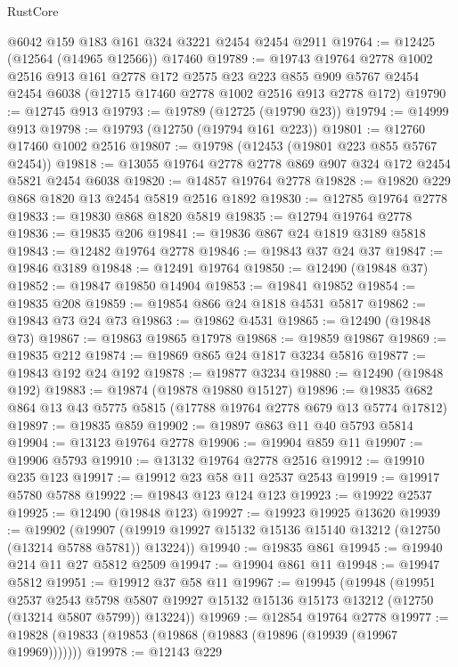\begin{lexlean}{RustCore}
\begin{coremodule}
    @6042
    @159
    @183
    @161
    @324
    @3221
    @2454
    @2454
    @2911
@19764 := @12425 (@12564 (@14965 @12566)) @17460
@19789 := @19743
    @19764
    @2778
    @1002
    @2516
    @913
    @161
    @2778
    @172
    @2575
    @23
    @223
    @855
    @909
    @5767
    @2454
    @2454
    @6038
    (@12715 @17460 @2778 @1002 @2516 @913 @2778 @172)
@19790 := @12745 @913
@19793 := @19789 (@12725 (@19790 @23))
@19794 := @14999 @913
@19798 := @19793 (@12750 (@19794 @161 @223))
@19801 := @12760 @17460 @1002 @2516
@19807 := @19798 (@12453 (@19801 @223 @855 @5767 @2454))
@19818 := @13055 @19764 @2778 @2778 @869 @907 @324 @172 @2454 @5821 @2454 @6038
@19820 := @14857 @19764 @2778
@19828 := @19820 @229 @868 @1820 @13 @2454 @5819 @2516 @1892
@19830 := @12785 @19764 @2778
@19833 := @19830 @868 @1820 @5819
@19835 := @12794 @19764 @2778
@19836 := @19835 @206
@19841 := @19836 @867 @24 @1819 @3189 @5818
@19843 := @12482 @19764 @2778
@19846 := @19843 @37 @24 @37
@19847 := @19846 @3189
@19848 := @12491 @19764
@19850 := @12490 (@19848 @37)
@19852 := @19847 @19850 @14904
@19853 := @19841 @19852
@19854 := @19835 @208
@19859 := @19854 @866 @24 @1818 @4531 @5817
@19862 := @19843 @73 @24 @73
@19863 := @19862 @4531
@19865 := @12490 (@19848 @73)
@19867 := @19863 @19865 @17978
@19868 := @19859 @19867
@19869 := @19835 @212
@19874 := @19869 @865 @24 @1817 @3234 @5816
@19877 := @19843 @192 @24 @192
@19878 := @19877 @3234
@19880 := @12490 (@19848 @192)
@19883 := @19874 (@19878 @19880 @15127)
@19896 := @19835 @682 @864 @13 @43 @5775 @5815 (@17788 @19764 @2778 @679 @13 @5774 @17812)
@19897 := @19835 @859
@19902 := @19897 @863 @11 @40 @5793 @5814
@19904 := @13123 @19764 @2778
@19906 := @19904 @859 @11
@19907 := @19906 @5793
@19910 := @13132 @19764 @2778 @2516
@19912 := @19910 @235 @123
@19917 := @19912 @23 @58 @11 @2537 @2543
@19919 := @19917 @5780 @5788
@19922 := @19843 @123 @124 @123
@19923 := @19922 @2537
@19925 := @12490 (@19848 @123)
@19927 := @19923 @19925 @13620
@19939 := @19902
    (@19907 (@19919 @19927 @15132 @15136 @15140 @13212 (@12750 (@13214 @5788 @5781)) @13224))
@19940 := @19835 @861
@19945 := @19940 @214 @11 @27 @5812 @2509
@19947 := @19904 @861 @11
@19948 := @19947 @5812
@19951 := @19912 @37 @58 @11
@19967 := @19945
    (@19948
      (@19951
        @2537
        @2543
        @5798
        @5807
        @19927
        @15132
        @15136
        @15173
        @13212
        (@12750 (@13214 @5807 @5799))
        @13224))
@19969 := @12854 @19764 @2778
@19977 := @19828 (@19833 (@19853 (@19868 (@19883 (@19896 (@19939 (@19967 @19969)))))))
@19978 := @12143 @229

\end{coremodule}
\end{lexlean}
